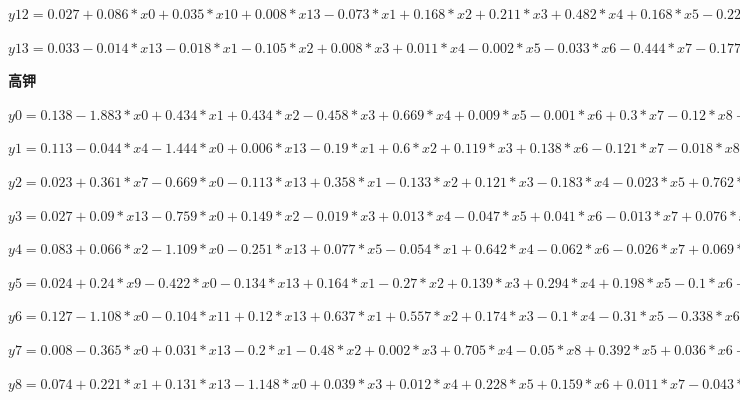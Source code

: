\documentclass[UTF8]{ctexart}
\begin{document}
\noindent$y12 = 0.027 + 0.086 * x0 + 0.035 * x10 + 0.008 * x13 - 0.073 * x1 + 0.168 * x2 + 0.211 * x3 + 0.482 * x4 + 0.168 * x5 - 0.226 * x6 - 0.406 * x7 + 0.292 * x8 - 0.238 * x9 - 0.026 * x12 - 0.011 * x14$

\noindent$y13 = 0.033 - 0.014 * x13 - 0.018 * x1 - 0.105 * x2 + 0.008 * x3 + 0.011 * x4 - 0.002 * x5 - 0.033 * x6 - 0.444 * x7 - 0.177 * x8 - 0.063 * x9 - 0.072 * x10 + 0.004 * x11 - 0.023 * x12 + 0.004 * x14$

\noindent\textbf{高钾}




\noindent$y0 = 0.138 - 1.883 * x0 + 0.434 * x1 + 0.434 * x2 - 0.458 * x3 + 0.669 * x4 + 0.009 * x5 - 0.001 * x6 + 0.3 * x7 - 0.12 * x8 + 0.033 * x9 - 0.202 * x10 + 0.024 * x11 + 0.092 * x12 - 0.024 * x14$

\noindent$y1 = 0.113 - 0.044 * x4 - 1.444 * x0 + 0.006 * x13 - 0.19 * x1 + 0.6 * x2 + 0.119 * x3 + 0.138 * x6 - 0.121 * x7 - 0.018 * x8 + 0.381 * x9 + 0.251 * x10 - 0.032 * x11 - 0.19 * x12 - 0.014 * x14$

\noindent$y2 = 0.023 + 0.361 * x7 - 0.669 * x0 - 0.113 * x13 + 0.358 * x1 - 0.133 * x2 + 0.121 * x3 - 0.183 * x4 - 0.023 * x5 + 0.762 * x6 - 0.057 * x9 + 0.476 * x10 - 0.122 * x11 - 0.2 * x12 + 0.001 * x14$

\noindent$y3 = 0.027 + 0.09 * x13 - 0.759 * x0 + 0.149 * x2 - 0.019 * x3 + 0.013 * x4 - 0.047 * x5 + 0.041 * x6 - 0.013 * x7 + 0.076 * x8 - 0.048 * x9 + 0.051 * x10 + 0.054 * x11 + 0.098 * x12 + 0.031 * x14$

\noindent$y4 = 0.083 + 0.066 * x2 - 1.109 * x0 - 0.251 * x13 + 0.077 * x5 - 0.054 * x1 + 0.642 * x4 - 0.062 * x6 - 0.026 * x7 + 0.069 * x8 + 0.0 * x9 + 0.117 * x10 + 0.133 * x11 + 0.07 * x12 - 0.003 * x14$

\noindent$y5 = 0.024 + 0.24 * x9 - 0.422 * x0 - 0.134 * x13 + 0.164 * x1 - 0.27 * x2 + 0.139 * x3 + 0.294 * x4 + 0.198 * x5 - 0.1 * x6 + 0.088 * x7 + 0.326 * x8 + 0.072 * x11 + 0.182 * x12 - 0.007 * x14$

\noindent$y6 = 0.127 - 1.108 * x0 - 0.104 * x11 + 0.12 * x13 + 0.637 * x1 + 0.557 * x2 + 0.174 * x3 - 0.1 * x4 - 0.31 * x5 - 0.338 * x6 - 0.173 * x7 - 0.285 * x8 - 0.144 * x9 + 0.376 * x10 - 0.016 * x14$

\noindent$y7 = 0.008 - 0.365 * x0 + 0.031 * x13 - 0.2 * x1 - 0.48 * x2 + 0.002 * x3 + 0.705 * x4 - 0.05 * x8 + 0.392 * x5 + 0.036 * x6 - 0.179 * x7 + 0.316 * x10 + 0.023 * x11 - 0.092 * x12 + 0.026 * x14$

\noindent$y8 = 0.074 + 0.221 * x1 + 0.131 * x13 - 1.148 * x0 + 0.039 * x3 + 0.012 * x4 + 0.228 * x5 + 0.159 * x6 + 0.011 * x7 - 0.043 * x8 - 0.177 * x9 - 0.129 * x10 - 0.041 * x11 + 0.127 * x12 + 0.013 * x14$
\end{document}
